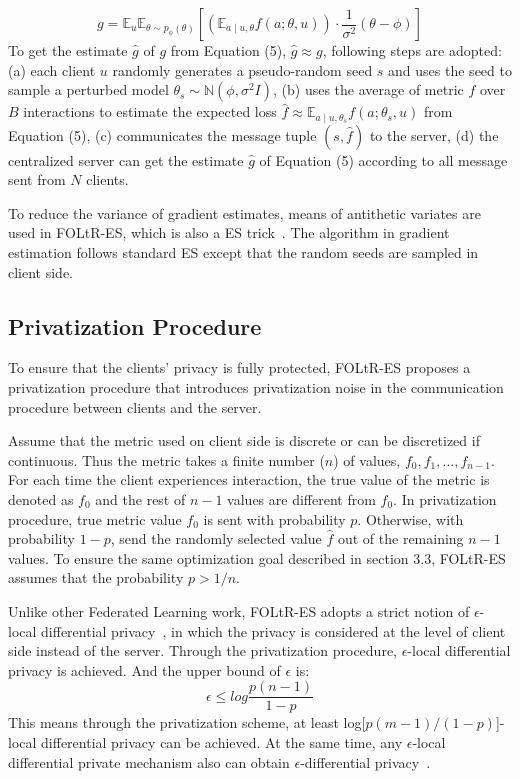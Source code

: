 \begin{equation}
	g=\mathbb{E}_{u} \mathbb{E}_{\theta \sim p_{\phi}(\theta)}\left[\left(\mathbb{E}_{a \mid u, \theta} f(a ; \theta, u)\right) \cdot \frac{1}{\sigma^{2}}(\theta-\phi)\right]
\end{equation}
To get the estimate $\hat{g}$ of $g$ from Equation (5), $\hat{g} \approx g$, following steps are adopted: (a) each client $u$ randomly generates a pseudo-random seed $s$ and uses the seed to sample a perturbed model $\theta_{s} \sim \mathbb{N}\left(\phi, \sigma^{2} I\right)$, (b) uses the average of metric $f$ over $B$ interactions to estimate the expected loss $\hat{f} \approx \mathbb{E}_{a \mid u, \theta_{s}} f(a;\theta_s, u) $ from Equation (5), (c) communicates the message tuple $(s,\hat{f})$ to the server, (d) the centralized server can get the estimate $\hat{g}$ of Equation (5) according to all message sent from $N$ clients.

To reduce the variance of gradient estimates, means of antithetic variates are used in FOLtR-ES, which is also a ES trick~\cite{salimans2017evolution}. The algorithm in gradient estimation follows standard ES except that the random seeds are sampled in client side.

\subsection{Privatization Procedure}
To ensure that the clients' privacy is fully protected, FOLtR-ES proposes a privatization procedure that introduces privatization noise in the communication procedure  between clients and the server.

Assume that the metric used on client side is discrete or can be discretized if continuous. Thus the metric takes a finite number ($n$) of values, $f_0, f_1, ..., f_{n-1}$. For each time the client experiences interaction, the true value of the metric is denoted as $f_0$ and the rest of $n-1$ values are different from $f_0$. In privatization procedure, true metric value $f_0$ is sent with probability $p$. Otherwise, with probability $1-p$, send the randomly selected value $\hat{f}$ out of the remaining $n-1$ values. To ensure the same optimization goal described in section 3.3, FOLtR-ES assumes that the probability $p > 1/n$.

Unlike other Federated Learning work, FOLtR-ES adopts a strict notion of $\epsilon$-local differential privacy~\cite{}, in which the privacy is considered at the level of client side instead of the server. Through the privatization procedure, $\epsilon$-local differential privacy is achieved. And the upper bound of $\epsilon$ is:
\begin{equation}
	\epsilon \leq log\frac{p(n-1)}{1-p} 
\end{equation}
This means through the privatization scheme, at least log[$p(m-1)/(1-p)$]-local differential privacy can be achieved. At the same time, any $\epsilon$-local differential private mechanism also can obtain $\epsilon$-differential privacy~\cite{dwork2014algorithmic}.